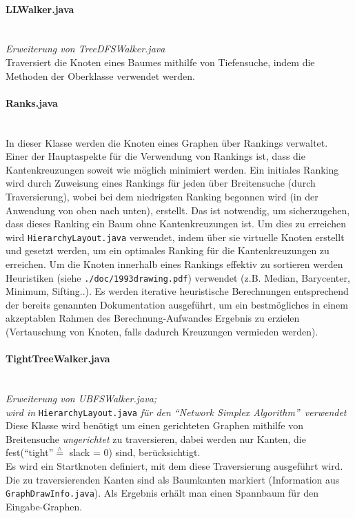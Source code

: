 \documentclass[10pt,a4paper]{article}
\begin{document}
\paragraph{LLWalker.java}\ \\
\emph{Erweiterung von TreeDFSWalker.java}\\
{\footnotesize Traversiert die Knoten eines Baumes mithilfe von Tiefensuche, indem die Methoden der Oberklasse verwendet werden.}

\paragraph{Ranks.java}\ \\
{\footnotesize In dieser Klasse werden die Knoten eines Graphen über Rankings verwaltet. Einer der Hauptaspekte für die Verwendung von Rankings ist, dass die Kantenkreuzungen soweit wie möglich minimiert werden. Ein initiales Ranking wird durch Zuweisung eines Rankings für jeden über Breitensuche (durch Traversierung), wobei bei dem niedrigsten Ranking begonnen wird (in der Anwendung von oben nach unten), erstellt. Das ist notwendig, um sicherzugehen, dass dieses Ranking ein Baum ohne Kantenkreuzungen ist. Um dies zu erreichen wird \texttt{HierarchyLayout.java} verwendet, indem über sie virtuelle Knoten erstellt und gesetzt werden, um ein optimales Ranking für die Kantenkreuzungen zu erreichen. Um die Knoten innerhalb eines Rankings effektiv zu sortieren werden Heuristiken (siehe \texttt{./doc/1993drawing.pdf}) verwendet (z.B. Median, Barycenter, Minimum, Sifting..). Es werden iterative heuristische Berechnungen entsprechend der bereits genannten Dokumentation ausgeführt, um ein bestmögliches in einem akzeptablen Rahmen des Berechnung-Aufwandes Ergebnis zu erzielen (Vertauschung von Knoten, falls dadurch Kreuzungen vermieden werden).}

\paragraph{TightTreeWalker.java}\ \\
\textit{Erweiterung von UBFSWalker.java;\\ wird in} {\small \texttt{HierarchyLayout.java}} \textit{für den "`Network Simplex Algorithm"'\ verwendet}\\
{\footnotesize Diese Klasse wird benötigt um einen gerichteten Graphen mithilfe von Breitensuche \textit{ungerichtet} zu traversieren, dabei werden nur Kanten, die fest("`tight"'$\overset{\wedge}{=}$ slack = 0) sind, berücksichtigt. \\
Es wird ein Startknoten definiert, mit dem diese Traversierung ausgeführt wird. Die zu traversierenden Kanten sind als Baumkanten markiert (Information aus \texttt{GraphDrawInfo.java}). Als Ergebnis erhält man einen Spannbaum für den Eingabe-Graphen.}
\end{document}
